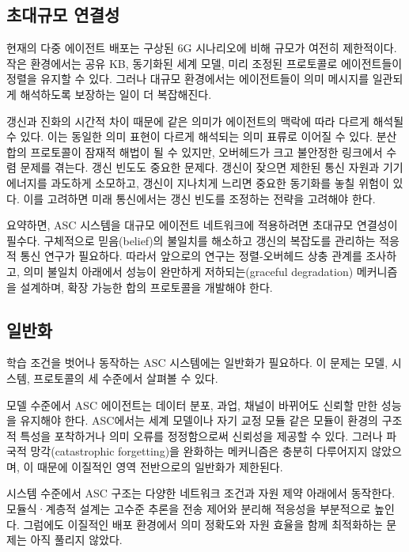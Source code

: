\subsection{초대규모 연결성}

현재의 다중 에이전트 배포는 구상된 6G 시나리오에 비해 규모가 여전히 제한적이다. 작은 환경에서는 공유 KB, 동기화된 세계 모델, 미리 조정된 프로토콜로 에이전트들이 정렬을 유지할 수 있다. 그러나 대규모 환경에서는 에이전트들이 의미 메시지를 일관되게 해석하도록 보장하는 일이 더 복잡해진다.

갱신과 진화의 시간적 차이 때문에 같은 의미가 에이전트의 맥락에 따라 다르게 해석될 수 있다. 이는 동일한 의미 표현이 다르게 해석되는 의미 표류로 이어질 수 있다. 분산 합의 프로토콜이 잠재적 해법이 될 수 있지만, 오버헤드가 크고 불안정한 링크에서 수렴 문제를 겪는다. 갱신 빈도도 중요한 문제다. 갱신이 잦으면 제한된 통신 자원과 기기 에너지를 과도하게 소모하고, 갱신이 지나치게 느리면 중요한 동기화를 놓칠 위험이 있다. 이를 고려하면 미래 통신에서는 갱신 빈도를 조정하는 전략을 고려해야 한다.

요약하면, ASC 시스템을 대규모 에이전트 네트워크에 적용하려면 초대규모 연결성이 필수다. 구체적으로 믿음(belief)의 불일치를 해소하고 갱신의 복잡도를 관리하는 적응적 통신 연구가 필요하다. 따라서 앞으로의 연구는 정렬-오버헤드 상충 관계를 조사하고, 의미 불일치 아래에서 성능이 완만하게 저하되는(graceful degradation) 메커니즘을 설계하며, 확장 가능한 합의 프로토콜을 개발해야 한다.

\subsection{일반화}

학습 조건을 벗어나 동작하는 ASC 시스템에는 일반화가 필요하다. 이 문제는 모델, 시스템, 프로토콜의 세 수준에서 살펴볼 수 있다.

모델 수준에서 ASC 에이전트는 데이터 분포, 과업, 채널이 바뀌어도 신뢰할 만한 성능을 유지해야 한다. ASC에서는 세계 모델이나 자기 교정 모듈 같은 모듈이 환경의 구조적 특성을 포착하거나 의미 오류를 정정함으로써 신뢰성을 제공할 수 있다. 그러나 파국적 망각(catastrophic forgetting)을 완화하는 메커니즘은 충분히 다루어지지 않았으며, 이 때문에 이질적인 영역 전반으로의 일반화가 제한된다.

시스템 수준에서 ASC 구조는 다양한 네트워크 조건과 자원 제약 아래에서 동작한다. 모듈식·계층적 설계는 고수준 추론을 전송 제어와 분리해 적응성을 부분적으로 높인다. 그럼에도 이질적인 배포 환경에서 의미 정확도와 자원 효율을 함께 최적화하는 문제는 아직 풀리지 않았다.

